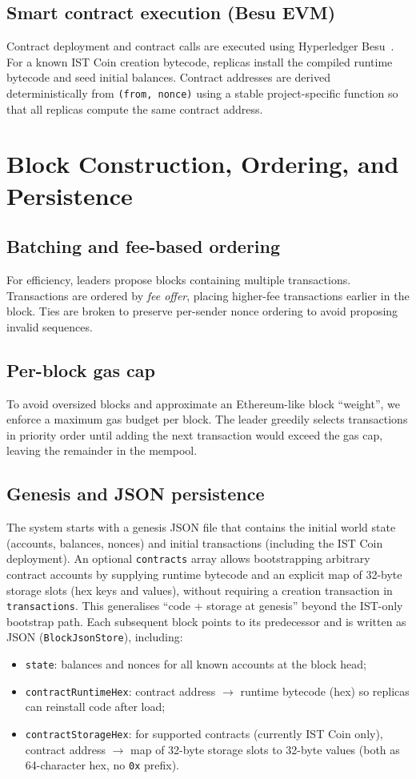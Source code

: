 \documentclass[runningheads]{llncs}
\begin{document}
\subsection{Smart contract execution (Besu EVM)}
Contract deployment and contract calls are executed using Hyperledger Besu~\cite{besu}.
For a known IST Coin creation bytecode, replicas install the compiled runtime bytecode and seed initial balances.
Contract addresses are derived deterministically from \texttt{(from, nonce)} using a stable project-specific function so that all replicas compute
the same contract address.

\section{Block Construction, Ordering, and Persistence}
\subsection{Batching and fee-based ordering}
For efficiency, leaders propose blocks containing multiple transactions. Transactions are ordered by \emph{fee offer},
placing higher-fee transactions earlier in the block. Ties are broken to preserve per-sender nonce ordering to avoid proposing invalid sequences.

\subsection{Per-block gas cap}
To avoid oversized blocks and approximate an Ethereum-like block ``weight'', we enforce a maximum gas budget per block.
The leader greedily selects transactions in priority order until adding the next transaction would exceed the gas cap, leaving the remainder in the mempool.

\subsection{Genesis and JSON persistence}
The system starts with a genesis JSON file that contains the initial world state (accounts, balances, nonces) and initial transactions (including
the IST Coin deployment). An optional \texttt{contracts} array allows bootstrapping arbitrary contract accounts by supplying runtime bytecode
and an explicit map of 32-byte storage slots (hex keys and values), without requiring a creation transaction in \texttt{transactions}.
This generalises ``code + storage at genesis'' beyond the IST-only bootstrap path. Each subsequent block points to its predecessor and is written as JSON (\texttt{BlockJsonStore}), including:
\begin{itemize}
  \item \texttt{state}: balances and nonces for all known accounts at the block head;
  \item \texttt{contractRuntimeHex}: contract address $\rightarrow$ runtime bytecode (hex) so replicas can reinstall code after load;
  \item \texttt{contractStorageHex}: for supported contracts (currently IST Coin only), contract address $\rightarrow$ map of 32-byte storage slots to 32-byte values
  (both as 64-character hex, no \texttt{0x} prefix).
\end{itemize}
\end{document}
